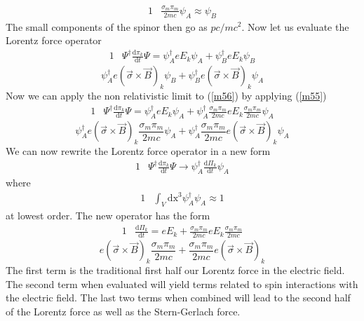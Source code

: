 \documentclass[]{article}
\numberwithin{equation}{subsection}
\begin{document}
\begin{alignat}{1}
  \label{m55}		&\frac{\sigma_{m}\pi_{m}}{2mc}\psi_{A}\approx\psi_{B}
\end{alignat}
The small components of the spinor then go as $pc/mc^{2}$. Now let us evaluate the Lorentz force operator
\begin{alignat}{1}
  \label{m56}		&\Psi^{\dagger}\frac{\mathrm{d}\pi_{k}}{\mathrm{d}t}\Psi=\psi^{\dagger}_{A}eE_{k}\psi_{A}+\psi^{\dagger}_{B}eE_{k}\psi_{B}
\end{alignat}
$$
\psi^{\dagger}_{A}e(\vec{\sigma}\times\vec{B})_{k}\psi_{B}+\psi^{\dagger}_{B}e(\vec{\sigma}\times\vec{B})_{k}\psi_{A}
$$
Now we can apply the non relativistic limit to (\ref{m56}) by applying (\ref{m55})
\begin{alignat}{1}
  \label{m57}		&\Psi^{\dagger}\frac{\mathrm{d}\pi_{k}}{\mathrm{d}t}\Psi=\psi^{\dagger}_{A}eE_{k}\psi_{A}+\psi^{\dagger}_{A}\frac{\sigma_{m}\pi_{m}}{2mc}eE_{k}\frac{\sigma_{m}\pi_{m}}{2mc}\psi_{A}
\end{alignat}
$$
\psi^{\dagger}_{A}e(\vec{\sigma}\times\vec{B})_{k}\frac{\sigma_{m}\pi_{m}}{2mc}\psi_{A}+\psi^{\dagger}_{A}\frac{\sigma_{m}\pi_{m}}{2mc}e(\vec{\sigma}\times\vec{B})_{k}\psi_{A}
$$
We can now rewrite the Lorentz force operator in a new form
\begin{alignat}{1}
  \label{m58}		&\Psi^{\dagger}\frac{\mathrm{d}\pi_{k}}{\mathrm{d}t}\Psi\rightarrow\psi^{\dagger}_{A}\frac{\mathrm{d}\Pi_{k}}{\mathrm{d}t}\psi_{A}
\end{alignat}
where
\begin{alignat}{1}
  \label{m59}		&\int_{V}\mathrm{dx}^{3}\psi^{\dagger}_{A}\psi_{A}\approx 1
\end{alignat}
at lowest order. The new operator has the form
\begin{alignat}{1}
  \label{m60}		&\frac{\mathrm{d}\Pi_{k}}{\mathrm{d}t}=eE_{k}+\frac{\sigma_{m}\pi_{m}}{2mc}eE_{k}\frac{\sigma_{m}\pi_{m}}{2mc}
\end{alignat}
$$
e(\vec{\sigma}\times\vec{B})_{k}\frac{\sigma_{m}\pi_{m}}{2mc}+\frac{\sigma_{m}\pi_{m}}{2mc}e(\vec{\sigma}\times\vec{B})_{k}
$$
The first term is the traditional first half our Lorentz force in the electric field. The second term when evaluated will yield terms related to spin interactions with the electric field. The last two terms when combined will lead to the second half of the Lorentz force as well as the Stern-Gerlach force.
\end{document}
